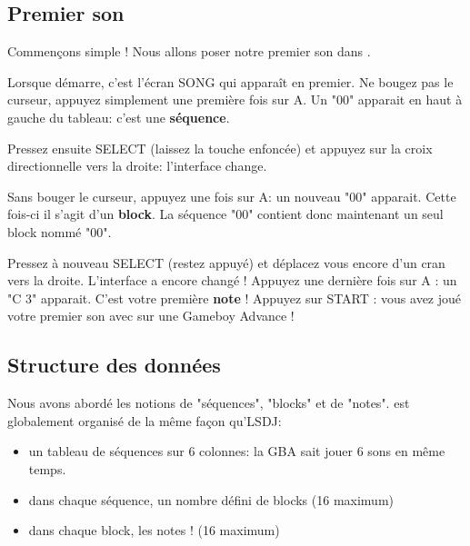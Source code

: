 \documentclass[12pt,a4paper]{article}
\begin{document}
    \subsection{Premier son}

    Commençons simple ! Nous allons poser notre premier son dans \FAT.\medskip
    
    Lorsque \FAT démarre, c'est l'écran SONG qui apparaît en premier.
    Ne bougez pas le curseur, appuyez simplement une première fois sur A.
    Un "00" apparait en haut à gauche du tableau: c'est une {\bf séquence}.
    
    
    Pressez ensuite SELECT (laissez la touche enfoncée) et appuyez sur la croix directionnelle vers la droite: l'interface change.
    
    
    Sans bouger le curseur, appuyez une fois sur A: un nouveau "00" apparait.
    Cette fois-ci il s'agit d'un {\bf block}. La séquence "00" contient donc maintenant un seul block nommé "00".
    
        
    Pressez à nouveau SELECT (restez appuyé) et déplacez vous encore d'un cran vers la droite.
    L'interface a encore changé !
    Appuyez une dernière fois sur A : un "C 3" apparait.
    C'est votre première {\bf note} !
    Appuyez sur START : vous avez joué votre premier son avec \FAT sur une Gameboy Advance !
    
    
    \subsection{Structure des données}
    
    Nous avons abordé les notions de "séquences", "blocks" et de "notes".
    \FAT est globalement organisé de la même façon qu'LSDJ:
    \medskip

    \begin{itemize}
        \item{un tableau de séquences sur 6 colonnes: la GBA sait jouer 6 sons en même temps.}
        \item{dans chaque séquence, un nombre défini de blocks (16 maximum)}
        \item{dans chaque block, les notes ! (16 maximum)}
    \end{itemize}
    \medskip
    
\end{document}
